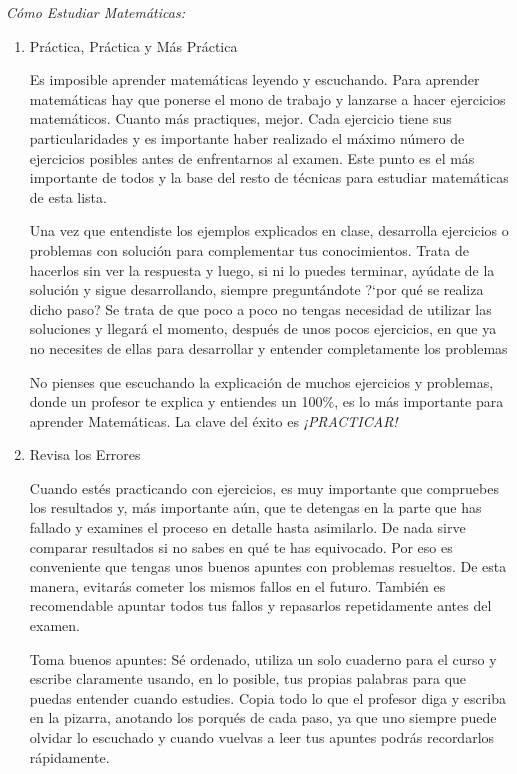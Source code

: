 \emph{Cómo Estudiar Matemáticas:}
 
\begin{enumerate}
	 

\item Práctica, Práctica y Más Práctica

Es imposible aprender matemáticas leyendo y escuchando. Para aprender matemáticas hay que ponerse el mono de trabajo y lanzarse a hacer ejercicios matemáticos. Cuanto más practiques, mejor. Cada ejercicio tiene sus particularidades y es importante haber realizado el máximo número de ejercicios posibles antes de enfrentarnos al examen. Este punto es el más importante de todos y la base del resto de técnicas para estudiar matemáticas de esta lista.

Una vez que entendiste los ejemplos explicados en clase, desarrolla ejercicios o problemas con solución para complementar tus conocimientos. Trata de hacerlos sin ver la respuesta y luego, si ni lo puedes terminar, ayúdate de la solución y sigue desarrollando, siempre preguntándote ?`por qué se realiza dicho paso? Se trata de que poco a poco no tengas necesidad de utilizar las soluciones y llegará el momento, después de unos pocos ejercicios, en que ya no necesites de ellas para desarrollar y entender completamente los problemas

No pienses que escuchando la explicación de muchos ejercicios y problemas, donde un profesor te explica y entiendes un 100$\%$, es lo más importante para aprender Matemáticas. La clave del éxito es \emph{¡PRACTICAR!}

\item Revisa los Errores

Cuando estés practicando con ejercicios, es muy importante que compruebes los resultados y, más importante aún, que te detengas en la parte que has fallado y examines el proceso en detalle hasta asimilarlo. De nada sirve comparar resultados si no sabes en qué te has equivocado. Por eso es conveniente que tengas unos buenos apuntes con problemas resueltos. De esta manera, evitarás cometer los mismos fallos en el futuro. También es recomendable apuntar todos tus fallos y repasarlos repetidamente antes del examen.

Toma buenos apuntes: Sé ordenado, utiliza un solo cuaderno para el curso y escribe claramente usando, en lo posible, tus propias palabras para que puedas entender cuando estudies. Copia todo lo que el profesor diga y escriba en la pizarra, anotando los porqués de cada paso, ya que uno siempre puede olvidar lo escuchado y cuando vuelvas a leer tus apuntes podrás recordarlos rápidamente.


\end{enumerate}
